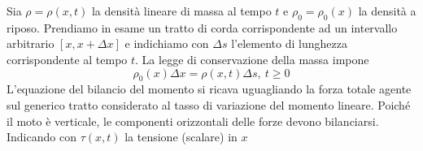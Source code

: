 \documentclass[10pt,a4paper,twoside,openright]{book}
\begin{document}
Sia $\displaystyle \rho =\rho ( x,t)$ la densità lineare di massa al tempo $\displaystyle t$ e $\displaystyle \rho _{0} =\rho _{0}( x)$ la densità a riposo. Prendiamo in esame un tratto di corda corrispondente ad un intervallo arbitrario $\displaystyle [ x,x+\Delta x]$ e indichiamo con $\displaystyle \Delta s$ l'elemento di lunghezza corrispondente al tempo $\displaystyle t$. La legge di conservazione della massa impone
\begin{equation*}
	\rho _{0}( x) \Delta x=\rho ( x,t) \Delta s,\ t\geqslant 0
\end{equation*}
L'equazione del bilancio del momento si ricava uguagliando la forza totale agente sul generico tratto considerato al tasso di variazione del momento lineare. Poiché il moto è verticale, le componenti orizzontali delle forze devono bilanciarsi. Indicando con $\displaystyle \tau ( x,t)$ la tensione (scalare) in $\displaystyle x$

\end{document}

